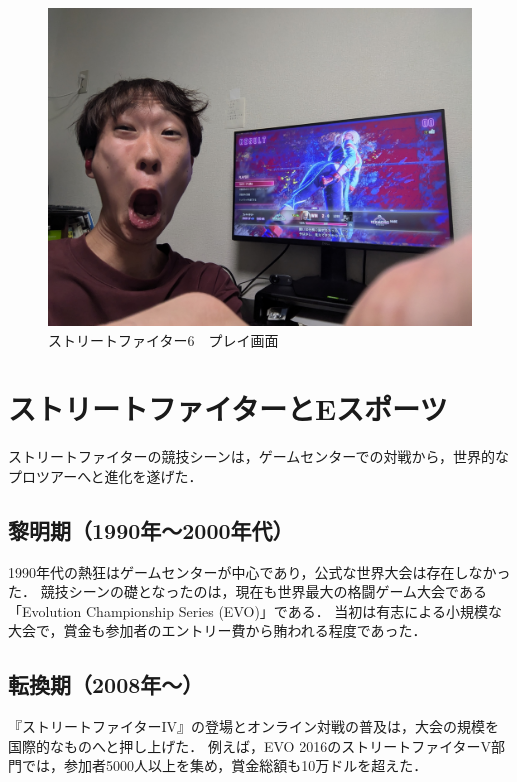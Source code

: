 \documentclass[twocolumn, a4paper]{Zemiresume}
\begin{document}
\begin{figure}[t]
  \centering
  \includegraphics[width=\columnwidth]{img/SF6_Master.jpg}
  \caption{ストリートファイター6　プレイ画面}\label{fig:sf6_master}
\end{figure}

\section{ストリートファイターとEスポーツ}
ストリートファイターの競技シーンは，ゲームセンターでの対戦から，世界的なプロツアーへと進化を遂げた．

\subsection{黎明期（1990年〜2000年代）}
1990年代の熱狂はゲームセンターが中心であり，公式な世界大会は存在しなかった．
競技シーンの礎となったのは，現在も世界最大の格闘ゲーム大会である「Evolution Championship Series (EVO)」である．
当初は有志による小規模な大会で，賞金も参加者のエントリー費から賄われる程度であった．

\subsection{転換期（2008年〜）}
『ストリートファイターIV』の登場とオンライン対戦の普及は，大会の規模を国際的なものへと押し上げた．
例えば，EVO 2016のストリートファイターV部門では，参加者5000人以上を集め，賞金総額も10万ドルを超えた\cite{cite:evo2016}．
\end{document}
